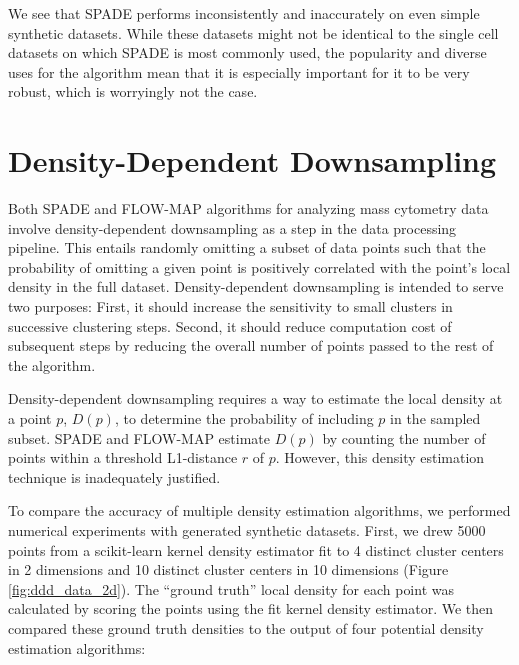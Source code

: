 \documentclass{article}
\begin{document}




We see that SPADE performs inconsistently and inaccurately on even simple synthetic datasets. While these datasets might not be identical to the single cell datasets on which SPADE is most commonly used, the popularity and diverse uses for the algorithm mean that it is especially important for it to be very robust, which is worryingly not the case.



\section{Density-Dependent Downsampling}
\label{sec:downsampling}
Both SPADE and FLOW-MAP algorithms for analyzing mass cytometry data involve density-dependent downsampling as a step in the data processing pipeline. This entails randomly omitting a subset of data points such that the probability of omitting a given point is positively correlated with the point’s local density in the full dataset.  Density-dependent downsampling is intended to serve two purposes:  First, it should increase the sensitivity to small clusters in successive clustering steps. Second, it should reduce computation cost of subsequent steps by reducing the overall number of points passed to the rest of the algorithm.

Density-dependent downsampling requires a way to estimate the local density at a point $p$, $D(p)$, to determine the probability of including $p$ in the sampled subset.  SPADE and FLOW-MAP estimate $D(p)$ by counting the number of points within a threshold L1-distance $r$ of $p$. However, this density estimation technique is inadequately justified.

To compare the accuracy of multiple density estimation algorithms, we performed numerical experiments with generated synthetic datasets. First, we drew 5000 points from a scikit-learn kernel density estimator \cite{} fit to 4 distinct cluster centers in 2 dimensions and 10 distinct cluster centers in 10 dimensions (Figure \ref{fig:ddd_data_2d}). The “ground truth” local density for each point was calculated by scoring the points using the fit kernel density estimator.  We then compared these ground truth densities to the output of four potential density estimation algorithms:
\end{document}
